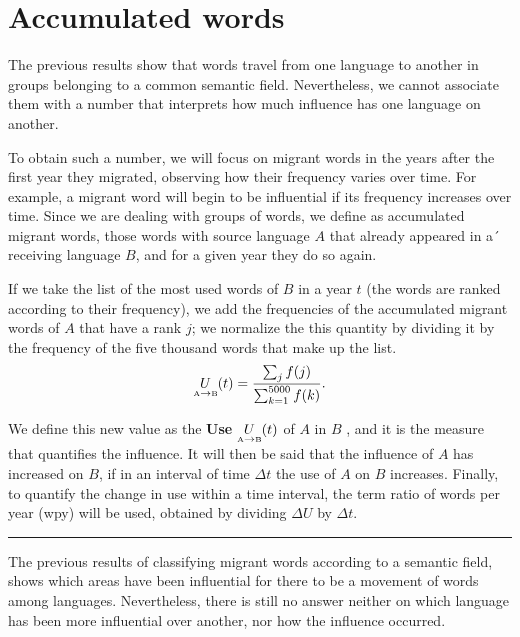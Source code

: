 \documentclass[10pt,letterpaper]{article} %
\begin{document}
	\section*{Accumulated words} %
	
	
	
	The previous results show that words travel from one language to another in groups belonging to a common semantic field. Nevertheless, we cannot associate them with a number that interprets how much influence has one language on another.
	
	To obtain such a number, we will focus on migrant words in the years after the first year they migrated, observing how their frequency varies over time. For example, a migrant word will begin to be influential if its frequency increases over time. Since we are dealing with groups of words, we define as accumulated migrant words, those words with source language $A$ that already appeared in a´ receiving language $B$, and for a given year they do so again.
	
	If we take the list of the most used words of $B$ in a year $t$ (the words are ranked according to their frequency), we add the frequencies of the accumulated migrant words of $A$ that have a rank $j$; we normalize the this quantity by dividing it by the frequency of the five thousand words that make up the list.
	\begin{equation}
	\label{ec.fuso}
	\underset{ \text{\tiny A} \to  \text{\tiny B} }{U}(t) = \frac{\sum_{j} f(j)}{\sum_{k=1}^{5000} f(k)}.
	\end{equation}
	
	We define this new value as the \textbf{Use} $\underset{ \text{\tiny A} \to \text{\tiny B} }{U}(t)$ of $A$ in $B$ , and it is the measure that quantifies the influence. It will then be said that the influence of $A$ has increased on $B$, if in an interval of time $\Delta t$ the use of $A$ on $B$ increases. Finally, to quantify the change in use within a time interval, the term ratio of words per year (wpy) will be used, obtained by dividing $\Delta U$  by  $\Delta t$.
	
	
	\noindent\rule{10cm}{0.4pt}
	
	The previous results of classifying migrant words according to a semantic
	field, shows which areas have been influential for there to be a movement of
	words among languages. Nevertheless, there is still no answer neither on which
	language has been more influential over another, nor how the influence
	occurred.
	
\end{document}
